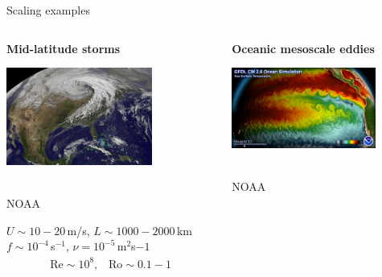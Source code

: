 \documentclass[aspectratio=169,xcolor=dvipsnames]{beamer}
\newcommand\credit[2]{
        \\ \vspace{-0.5em}
        {\color{gray}\scriptsize
        \hfill
        #1
        \hspace{#2}}
        }
\begin{document}
\begin{frame}[t]{Scaling examples}

\begin{columns}
    \begin{column}[t]{0.5\textwidth}
        \centering
        \textbf{Mid-latitude storms}
        \vspace{0.2cm}

        \includegraphics[width=0.7\textwidth]{figs/Fig-MidLatCyclone_2010-10-26_low_pressure.jpg}
        \credit{NOAA}{25pt}
        
        \vspace{0.5em}
        
         $U\sim10-20$\,m/s, \hspace{10pt}
        $L\sim1000-2000$\,km \\
        $f\sim10^{-4}$\,s$^{-1}$, \hspace{10pt} 
        $\nu = 10^{-5}$\,m$^2$s${-1}$\\
        
        {\boldmath
        \begin{align*}
            \text{Re}\sim10^{8}, \hspace{10pt}
            \text{Ro}\sim0.1-1 \\
        \end{align*}
        }
        
    \end{column}
    \begin{column}[t]{0.5\textwidth}
        \centering
        \textbf{Oceanic mesoscale eddies}
        \vspace{0.2cm}
        
        \includegraphics[width=0.8\textwidth]{figs/Fig-cm2.6-mesoscale-eddies.png}
        \credit{NOAA}{15pt}


\end{column}
\end{columns}
\end{frame}
\end{document}
